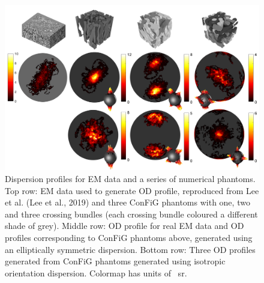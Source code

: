 \begin{figure}
  \centering
  \includegraphics[width=\textwidth]{figures/config/OD_ESAG_wcolorbar_wiso_sym_whitebg.png}
  \caption[Orientation distributions from real WM and ConFiG phantoms]{Dispersion profiles for EM data and a series of numerical phantoms. Top row: EM data used to generate OD profile, reproduced from Lee et al. (Lee et al., 2019) and three ConFiG phantoms with one, two and three crossing bundles (each crossing bundle coloured a different shade of grey). Middle row: OD profile for real EM data and OD profiles corresponding to ConFiG phantoms above, generated using an elliptically symmetric dispersion. Bottom row: Three OD profiles generated from ConFiG phantoms generated using isotropic orientation dispersion. Colormap has units of \si{\per\steradian}. }
  \label{fig:config_res_OD}
\end{figure}

